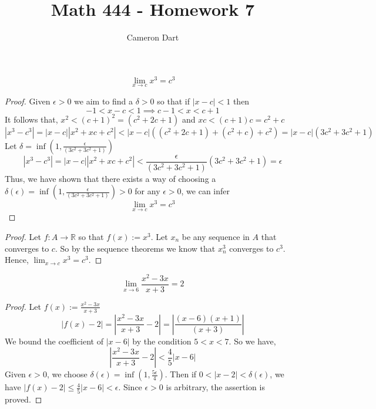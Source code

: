 \documentclass[12pt]{article}
\newcommand{\R}{\mathbb{R}}
\newenvironment{claim}[2][Claim]{\begin{trivlist}
		\item[\hskip \labelsep {\bfseries #1}\hskip \labelsep {\bfseries #2}]}{\end{trivlist}}
\begin{document}
	\title{Math 444 - Homework 7}
	\author{Cameron Dart}
	\maketitle

\begin{claim}{4.1.7}
	\[  \lim_{x \rightarrow c} x^3 = c^3  \]
\end{claim}

\begin{proof}
	Given $\epsilon > 0$ we aim to find a $\delta > 0$ so that if $|x - c| < 1$ then
	\[ -1 < x - c < 1 \implies c - 1 < x < c + 1 \]
	It follows that, $x^2 < (c + 1) ^2 = (c^2 + 2c + 1)$ and $xc < (c + 1)c = c^2 + c$ 
	\[ 
	  |x^3 - c^3| = |x - c| |x^2 + xc + c^2| < | x - c | ((c^2 + 2c + 1) + (c^2 + c) + c^2) = |x - c| (3c^2 + 3c^2 + 1)
	\]
	Let $\delta = \inf(1, \frac{\epsilon}{(3c^2 + 3c^2 + 1)})$\\
	\[
	|x^3 - c^3| = |x - c| |x^2 + xc + c^2| <  \frac{\epsilon}{(3c^2 + 3c^2 + 1)}  (3c^2 + 3c^2 + 1) = \epsilon
	\]
	Thus, we have shown that there exists a way of choosing a $\delta(\epsilon) = \inf(1,  
	\frac{\epsilon}{(3c^2 + 3c^2 + 1)})> 0$ for any $\epsilon > 0$, we can infer 
	 \[ \lim_{x \rightarrow c} x^3 = c^3  \]
\end{proof}

\begin{proof}
	Let $f: A \rightarrow \R$ so that $f(x):=x^3$. Let $x_n$ be any sequence in $A$ that converges to $c$. So by the sequence theorems we know that $x_n^3$ converges to $c^3$. Hence,
	$\lim_{x \rightarrow c} x^3 = c^3$.
\end{proof}

\begin{claim}{4.2.11b}
	\[
		\lim_{x \rightarrow 6} \frac{x^2 - 3x}{x + 3} = 2
	\]
\end{claim}
\begin{proof}
	Let $f(x):= \frac{x^2 - 3x}{x + 3} $
	\[
		|f(x) - 2| = \left |\frac{x^2 - 3x}{x + 3} - 2 \right | = \left | \frac{(x-6)(x+1) }{(x+3)} \right | 
	\]
	We bound the coefficient of $|x-6|$ by the condition $5 < x < 7$. So we have,
	\[
	 \left |\frac{x^2 - 3x}{x + 3} - 2 \right | < \frac{4}{5} |x - 6|	
	\]
	Given $\epsilon > 0$, we choose $\delta(\epsilon) = \inf (1,\frac{5\epsilon}{4})$. Then if $0 < |x - 2| < \delta(\epsilon)$, we have $|f(x) - 2| \leq \frac{4}{5}|x - 6| < \epsilon$. Since $\epsilon > 0$ is arbitrary, the assertion is proved. 
\end{proof}
\end{document}
